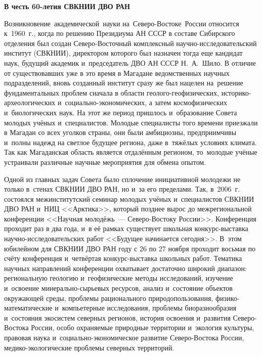 \begin{center}
  \textbf{В честь 60-летия СВКНИИ ДВО РАН}
\end{center}

Возникновение\,\,\,академической\,\,\,науки\,\,на\,\,\,Северо-Востоке\,\,\,России относится к~1960~г., когда по решению Президиума АН СССР в составе Сибирского отделения был создан Северо-Восточный комплексный научно-исследовательский институт (СВКНИИ), директором которого был назначен тогда еще кандидат наук, будущий академик и~председатель ДВО АН СССР Н.~А.~Шило. В отличие от существовавших уже в это время в Магадане ведомственных научных подразделений, вновь созданный институт сразу же был нацелен на~решение фундаментальных проблем сначала в области геолого-геофизических, историко-археологических и~социально-экономических, а затем космофизических и~биологических наук. На этот же период пришлось и~образование Совета молодых учёных и~специалистов. Молодые специалисты того времени приезжали в Магадан со всех уголков страны, они были амбициозны, предприимчивы и~полны надежд на светлое будущее региона, даже в~тяжёлых условиях климата. Так как Магаданская область является отдалённым регионом, то~молодые учёные устраивали различные научные мероприятия для обмена опытом.

Одной из главных задач Совета было сплочение инициативной молодежи не только в~стенах СВКНИИ ДВО РАН, но и~за его пределами. Так, в~2006~г. состоялся межинститутский семинар молодых учёных и~специалистов СВКНИИ ДВО РАН и~НИЦ <<Арктика>>, который позднее вырос до межрегиональной конференции <<Научная молодёжь~--- Северо-Востоку России>>. Конференция проходит раз в два года, и~в её рамках существует школьная конкурс-выставка научно-исследовательских работ <<Будущее начинается сегодня>>. В~этом юбилейном для СВКНИИ ДВО РАН году с 26 по 27 ноября проходит восьмая по счёту конференция и~четвёртая конкурс-выставка школьных работ. Тематика научных направлений конференции охватывает достаточно широкий диапазон: региональную геологию и~геофизические методы исследований, изучение и~освоение минерально-сырьевых ресурсов, анализ и~состояние объектов окружающей среды, проблемы рационального природопользования, физико-математические и~компьетерные исследования, проблемы биоразнообразия и~состояния экосистем северных регионов, история освоения и~развития Северо-Востока России, особо охраняемые природные территории и~экология культуры, правовая наука и~социально-экономическое развитие Северо-Востока России, медико-экологические проблемы северных территорий.


